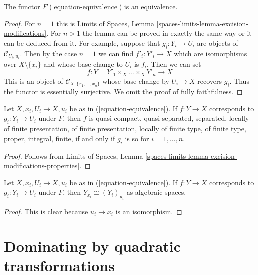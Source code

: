 \begin{lemma}
\label{lemma-equivalence}
The functor $F$ (\ref{equation-equivalence}) is an equivalence.
\end{lemma}

\begin{proof}
For $n = 1$ this is Limits of Spaces, Lemma
\ref{spaces-limits-lemma-excision-modifications}.
For $n > 1$ the lemma can be proved in exactly the same way or it
can be deduced from it. For example, suppose that
$g_i : Y_i \to U_i$ are objects of $\mathcal{C}_{U_i, u_i}$.
Then by the case $n = 1$ we can find $f'_i : Y'_i \to X$
which are isomorphisms over $X \setminus \{x_i\}$ and whose
base change to $U_i$ is $f_i$. Then we can set
$$
f : Y = Y'_1 \times_X \ldots \times_X Y'_n \to X
$$
This is an object of $\mathcal{C}_{X, \{x_1, \ldots, x_n\}}$
whose base change by $U_i \to X$ recovers $g_i$. Thus the functor
is essentially surjective. We omit the proof of
fully faithfulness.
\end{proof}

\begin{lemma}
\label{lemma-equivalence-properties}
Let $X, x_i, U_i \to X, u_i$ be as in (\ref{equation-equivalence}).
If $f : Y \to X$ corresponds to $g_i : Y_i \to U_i$ under $F$,
then $f$ is quasi-compact, quasi-separated, separated, locally of finite
presentation, of finite presentation, locally of finite type, of finite type,
proper, integral, finite, if and only if $g_i$ is so
for $i = 1, \ldots, n$.
\end{lemma}

\begin{proof}
Follows from Limits of Spaces, Lemma
\ref{spaces-limits-lemma-excision-modifications-properties}.
\end{proof}

\begin{lemma}
\label{lemma-equivalence-fibre}
Let $X, x_i, U_i \to X, u_i$ be as in (\ref{equation-equivalence}).
If $f : Y \to X$ corresponds to $g_i : Y_i \to U_i$ under $F$,
then $Y_{x_i} \cong (Y_i)_{u_i}$ as algebraic spaces.
\end{lemma}

\begin{proof}
This is clear because $u_i \to x_i$ is an isomorphism.
\end{proof}







\section{Dominating by quadratic transformations}
\label{section-quadratic-spaces}

